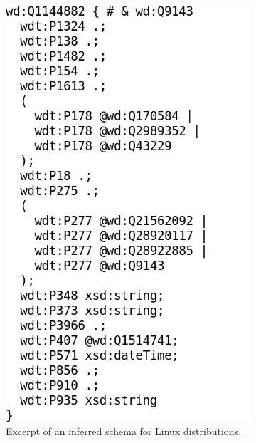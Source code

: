 \begin{figure}[t]
  \begin{subfigure}[t]{0.45\textwidth}
    \centering
    \includegraphics[trim={0 2.5cm 0 0},clip]{screenshots/shexc-no-syntax-highlighting}
    \caption{
      Excerpt of an inferred schema for Linux distributions.
    }
    \label{fig:shexc-syntax-highlighting-without}
  \end{subfigure}
  \begin{subfigure}[t]{0.45\textwidth}
    \centering

\end{subfigure}
\end{figure}
